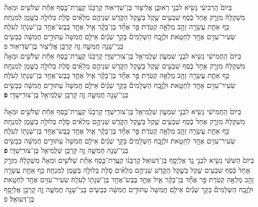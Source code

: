 \documentclass[twoside, openany, parskip=half, 11pt]{book}
\begin{document}
\begin{footnotesize}
\begin{multicols}{2}
בַּיּוֹם֙ הָֽרְבִיעִ֔י נָשִׂ֖יא לִבְנֵ֣י רְאוּבֵ֑ן אֱלִיצ֖וּר בֶּן־שְׁדֵיאֽוּר׃ קָרְבָּנ֜וֹ קַֽעֲרַת־כֶּ֣סֶף אַחַ֗ת שְׁלֹשִׁ֣ים וּמֵאָה֘ מִשְׁקָלָהּ֒ מִזְרָ֤ק אֶחָד֙ כֶּ֔סֶף שִׁבְעִ֥ים שֶׁ֖קֶל בְּשֶׁ֣קֶל הַקֹּ֑דֶשׁ שְׁנֵיהֶ֣ם מְלֵאִ֗ים סֹ֛לֶת בְּלוּלָ֥ה בַשֶּׁ֖מֶן לְמִנְחָֽה׃ כַּ֥ף אַחַ֛ת עֲשָׂרָ֥ה זָהָ֖ב מְלֵאָ֥ה קְטֹֽרֶת׃   פַּ֣ר אֶחָ֞ד בֶּן־בָּקָ֗ר אַ֧יִל אֶחָ֛ד כֶּֽבֶשׂ־אֶחָ֥ד בֶּן־שְׁנָת֖וֹ לְעֹלָֽה׃ שְׂעִיר־עִזִּ֥ים אֶחָ֖ד לְחַטָּֽאת׃ וּלְזֶ֣בַֽח הַשְּׁלָמִים֘ בָּקָ֣ר שְׁנַ֒יִם֒ אֵילִ֤ם חֲמִשָּׁה֙ עַתּוּדִ֣ים חֲמִשָּׁ֔ה כְּבָשִׂ֥ים בְּנֵֽי־שָׁנָ֖ה חֲמִשָּׁ֑ה זֶ֛ה קָרְבַּ֥ן אֱלִיצ֖וּר בֶּן־שְׁדֵיאֽוּר׃ פ\\
  בַּיּוֹם֙ הַֽחֲמִישִׁ֔י נָשִׂ֖יא לִבְנֵ֣י שִׁמְע֑וֹן שְׁלֻֽמִיאֵ֖ל בֶּן־צוּרִֽישַׁדָּֽי׃ קָרְבָּנ֜וֹ קַֽעֲרַת־כֶּ֣סֶף אַחַ֗ת שְׁלֹשִׁ֣ים וּמֵאָה֘ מִשְׁקָלָהּ֒ מִזְרָ֤ק אֶחָד֙ כֶּ֔סֶף שִׁבְעִ֥ים שֶׁ֖קֶל בְּשֶׁ֣קֶל הַקֹּ֑דֶשׁ שְׁנֵיהֶ֣ם מְלֵאִ֗ים סֹ֛לֶת בְּלוּלָ֥ה בַשֶּׁ֖מֶן לְמִנְחָֽה׃ כַּ֥ף אַחַ֛ת עֲשָׂרָ֥ה זָהָ֖ב מְלֵאָ֥ה קְטֹֽרֶת׃ פַּ֣ר אֶחָ֞ד בֶּן־בָּקָ֗ר אַ֧יִל אֶחָ֛ד כֶּֽבֶשׂ־אֶחָ֥ד בֶּן־שְׁנָת֖וֹ לְעֹלָֽה׃ שְׂעִיר־עִזִּ֥ים אֶחָ֖ד לְחַטָּֽאת׃ וּלְזֶ֣בַֽח הַשְּׁלָמִים֘ בָּקָ֣ר שְׁנַ֒יִם֒ אֵילִ֤ם חֲמִשָּׁה֙ עַתּוּדִ֣ים חֲמִשָּׁ֔ה כְּבָשִׂ֥ים בְּנֵֽי־שָׁנָ֖ה חֲמִשָּׁ֑ה זֶ֛ה קָרְבַּ֥ן שְׁלֻֽמִיאֵ֖ל בֶּן־צוּרִֽישַׁדָּֽי׃ \textbf{פ}  

\vfill\null
\columnbreak


בַּיּוֹם֙ הַֽחֲמִישִׁ֔י נָשִׂ֖יא לִבְנֵ֣י שִׁמְע֑וֹן שְׁלֻֽמִיאֵ֖ל בֶּן־צוּרִֽישַׁדָּֽי׃ קָרְבָּנ֜וֹ קַֽעֲרַת־כֶּ֣סֶף אַחַ֗ת שְׁלֹשִׁ֣ים וּמֵאָה֘ מִשְׁקָלָהּ֒ מִזְרָ֤ק אֶחָד֙ כֶּ֔סֶף שִׁבְעִ֥ים שֶׁ֖קֶל בְּשֶׁ֣קֶל הַקֹּ֑דֶשׁ שְׁנֵיהֶ֣ם מְלֵאִ֗ים סֹ֛לֶת בְּלוּלָ֥ה בַשֶּׁ֖מֶן לְמִנְחָֽה׃ כַּ֥ף אַחַ֛ת עֲשָׂרָ֥ה זָהָ֖ב מְלֵאָ֥ה קְטֹֽרֶת׃   פַּ֣ר אֶחָ֞ד בֶּן־בָּקָ֗ר אַ֧יִל אֶחָ֛ד כֶּֽבֶשׂ־אֶחָ֥ד בֶּן־שְׁנָת֖וֹ לְעֹלָֽה׃ שְׂעִיר־עִזִּ֥ים אֶחָ֖ד לְחַטָּֽאת׃ וּלְזֶ֣בַֽח הַשְּׁלָמִים֘ בָּקָ֣ר שְׁנַ֒יִם֒ אֵילִ֤ם חֲמִשָּׁה֙ עַתּוּדִ֣ים חֲמִשָּׁ֔ה כְּבָשִׂ֥ים בְּנֵֽי־שָׁנָ֖ה חֲמִשָּׁ֑ה זֶ֛ה קָרְבַּ֥ן שְׁלֻֽמִיאֵ֖ל בֶּן־צוּרִֽישַׁדָּֽי׃ \textbf{פ} \\ 
  בַּיּוֹם֙ הַשִּׁשִּׁ֔י נָשִׂ֖יא לִבְנֵ֣י גָ֑ד אֶלְיָסָ֖ף בֶּן־דְּעוּאֵֽל׃ קָרְבָּנ֜וֹ קַֽעֲרַת־כֶּ֣סֶף אַחַ֗ת שְׁלֹשִׁ֣ים וּמֵאָה֘ מִשְׁקָלָהּ֒ מִזְרָ֤ק אֶחָד֙ כֶּ֔סֶף שִׁבְעִ֥ים שֶׁ֖קֶל בְּשֶׁ֣קֶל הַקֹּ֑דֶשׁ שְׁנֵיהֶ֣ם מְלֵאִ֗ים סֹ֛לֶת בְּלוּלָ֥ה בַשֶּׁ֖מֶן לְמִנְחָֽה׃ כַּ֥ף אַחַ֛ת עֲשָׂרָ֥ה זָהָ֖ב מְלֵאָ֥ה קְטֹֽרֶת׃ פַּ֣ר אֶחָ֞ד בֶּן־בָּקָ֗ר אַ֧יִל אֶחָ֛ד כֶּֽבֶשׂ־אֶחָ֥ד בֶּן־שְׁנָת֖וֹ לְעֹלָֽה׃ שְׂעִיר־עִזִּ֥ים אֶחָ֖ד לְחַטָּֽאת׃ וּלְזֶ֣בַֽח הַשְּׁלָמִים֘ בָּקָ֣ר שְׁנַ֒יִם֒ אֵילִ֤ם חֲמִשָּׁה֙ עַתּוּדִ֣ים חֲמִשָּׁ֔ה כְּבָשִׂ֥ים בְּנֵֽי־שָׁנָ֖ה חֲמִשָּׁ֑ה זֶ֛ה קָרְבַּ֥ן אֶלְיָסָ֖ף בֶּן־דְּעוּאֵֽל׃ פ


\end{multicols}
\end{footnotesize}
\end{document}
